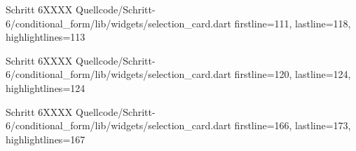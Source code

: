 \begin{alexlistingzwei}{Schritt 6}{XXXX}
    {Quellcode/Schritt-6/conditional_form/lib/widgets/selection_card.dart}
    {firstline=111, lastline=118, highlightlines={113}}
    \label{lst:Schritt6XXXX}
\end{alexlistingzwei}

\begin{alexlistingzwei}{Schritt 6}{XXXX}
    {Quellcode/Schritt-6/conditional_form/lib/widgets/selection_card.dart}
    {firstline=120, lastline=124, highlightlines={124}}
    \label{lst:Schritt6XXXX}
\end{alexlistingzwei}

\begin{alexlistingzwei}{Schritt 6}{XXXX}
    {Quellcode/Schritt-6/conditional_form/lib/widgets/selection_card.dart}
    {firstline=166, lastline=173, highlightlines={167}}
    \label{lst:Schritt6XXXX}
\end{alexlistingzwei}